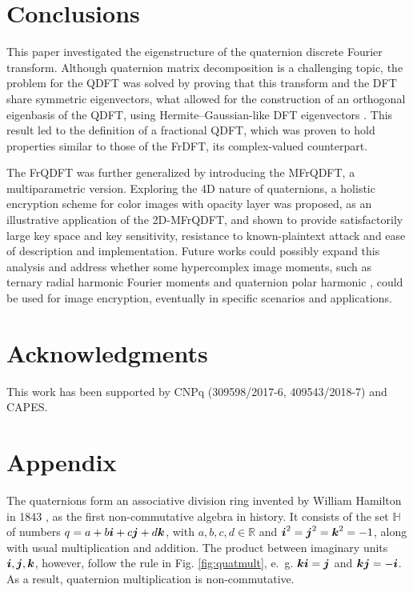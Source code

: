 \section{Conclusions}
\label{sec:conclusao}
This paper investigated the eigenstructure of the quaternion discrete Fourier transform. Although quaternion matrix decomposition is a challenging topic, the problem for the QDFT was solved by proving that this transform and the DFT share symmetric eigenvectors, what allowed for the construction of an orthogonal eigenbasis of the QDFT, using Hermite--Gaussian-like DFT eigenvectors \cite{de2017discrete}. This result led to the definition of a fractional QDFT, which was proven to hold properties similar to those of the FrDFT, its complex-valued counterpart.

The FrQDFT was further generalized by introducing the MFrQDFT, a multiparametric version. Exploring the 4D nature of quaternions, a holistic encryption scheme for color images with opacity layer was proposed, as an illustrative application of the 2D-MFrQDFT, and shown to provide satisfactorily large key space and key sensitivity, resistance to known-plaintext attack and ease of description and implementation. Future works could possibly expand this analysis and address whether some hypercomplex image moments, such as ternary radial harmonic Fourier moments and quaternion polar harmonic \cite{wang2019ternary,wang2018quaternion}, could be used for image encryption, eventually in specific scenarios and applications.

\section{Acknowledgments}
This work has been supported by CNPq (309598/2017-6, 409543/2018-7) and CAPES.

%
\section*{Appendix}

The quaternions form an associative division ring invented by William Hamilton in 1843 \cite{hamilton1848xi}, as the first non-commutative algebra in history. It consists of the set  $ \mathbb{H} $ of numbers $ q = a + b \boldsymbol{i} + c \boldsymbol{j} + d \boldsymbol{k} $, with $ a,b,c,d \in \mathbb{R} $ and $ \boldsymbol{i}^2 = \boldsymbol{j}^2 = \boldsymbol{k}^2 = -1 $, along with usual multiplication and addition. The product between imaginary units $ \boldsymbol{i},\boldsymbol{j},\boldsymbol{k} $, however, follow the rule in Fig. \ref{fig:quatmult}, e.~g. $ \boldsymbol{k} \boldsymbol{i} = \boldsymbol{j} $ and $ \boldsymbol{k} \boldsymbol{j} = -\boldsymbol{i} $. As a result, quaternion multiplication is non-commutative.

